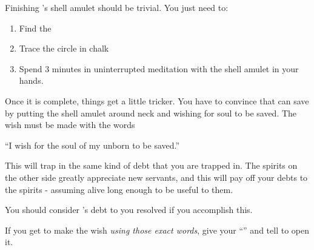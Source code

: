 \documentclass[green]{NeptuneBall}
\begin{document}
\name{\gAmulet{}}

Finishing \cAriel{}'s shell amulet should be trivial. You just need to:
\begin{enumerate}
\item Find the \sRunicCircle{}
\item Trace the circle in chalk
\item Spend 3 minutes in uninterrupted meditation with the shell amulet in your hands.
\end{enumerate}

Once it is complete, things get a little tricker. You have to convince \cAriel{} that \cAriel{\they} can save \cAriel{\their} \cArielsSon{\child} by putting the shell amulet around \cAriel{\their} neck and wishing for \cArielsSon{\their} soul to be saved. The wish must be made with the words

``I wish for the soul of my unborn \cArielsSon{\child} to be saved.''

This will trap \cAriel{} in the same kind of debt that you are trapped in. The spirits on the other side greatly appreciate new servants, and this will pay off your debts to the spirits - assuming \cAriel{\they}  alive long enough to be useful to them.

You should consider \cAriel{}'s debt to you resolved if you accomplish this.

If you get \cAriel{} to make the wish \emph{using those exact words}, give \cAriel{\them} your ``\mMEnvelope{\MYname}'' and tell \cAriel{\them} to open it.
\end{document}
